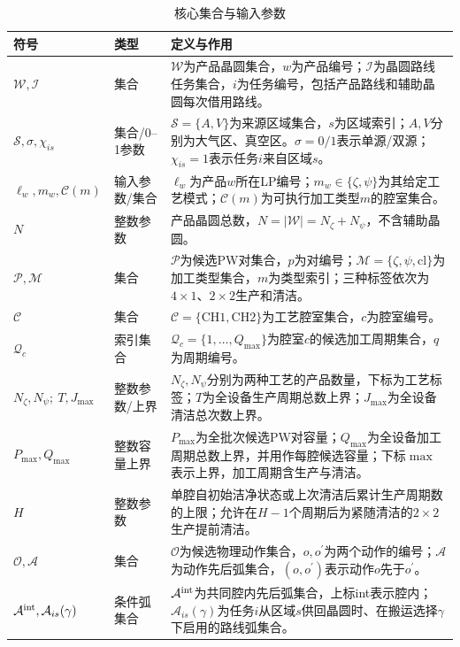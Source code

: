 \documentclass[final,5p,times,twocolumn]{elsarticle}
\begin{document}
\begin{table}[!t]
\centering
\scriptsize
\setlength{\tabcolsep}{3pt}
\caption{核心集合与输入参数}
\label{tab:symbol-cn-a}
\begin{tabular}{C{0.23\textwidth}C{0.10\textwidth}C{0.61\textwidth}}
\toprule
符号 & 类型 & 定义与作用 \\
\midrule
$\mathcal W,\mathcal I$ & 集合 & $\mathcal W$为产品晶圆集合，$w$为产品编号；$\mathcal I$为晶圆路线任务集合，$i$为任务编号，包括产品路线和辅助晶圆每次借用路线。\\
$\mathcal S,\sigma,\chi_{is}$ & 集合/0--1参数 & $\mathcal S=\{A,V\}$为来源区域集合，$s$为区域索引；$A,V$分别为大气区、真空区。$\sigma=0/1$表示单源/双源；$\chi_{is}=1$表示任务$i$来自区域$s$。\\
$\ell_w,m_w,\mathcal C(m)$ & 输入参数/集合 & $\ell_w$为产品$w$所在LP编号；$m_w\in\{\zeta,\psi\}$为其给定工艺模式；$\mathcal C(m)$为可执行加工类型$m$的腔室集合。\\
$N$ & 整数参数 & 产品晶圆总数，$N=|\mathcal W|=N_{\zeta}+N_{\psi}$，不含辅助晶圆。\\
$\mathcal P,\mathcal M$ & 集合 & $\mathcal P$为候选PW对集合，$p$为对编号；$\mathcal M=\{\zeta,\psi,\mathrm{cl}\}$为加工类型集合，$m$为类型索引；三种标签依次为$4\times1$、$2\times2$生产和清洁。\\
$\mathcal C$ & 集合 & $\mathcal C=\{\mathrm{CH1,CH2}\}$为工艺腔室集合，$c$为腔室编号。\\
$\mathcal Q_c$ & 索引集合 & $\mathcal Q_c=\{1,\ldots,Q_{\max}\}$为腔室$c$的候选加工周期集合，$q$为周期编号。\\
$N_{\zeta},N_{\psi};\ T,J_{\max}$ & 整数参数/上界 & $N_{\zeta},N_{\psi}$分别为两种工艺的产品数量，下标为工艺标签；$T$为全设备生产周期总数上界；$J_{\max}$为全设备清洁总次数上界。\\
$P_{\max},Q_{\max}$ & 整数容量上界 & $P_{\max}$为全批次候选PW对容量；$Q_{\max}$为全设备加工周期总数上界，并用作每腔候选容量；下标$\max$表示上界，加工周期含生产与清洁。\\
$H$ & 整数参数 & 单腔自初始洁净状态或上次清洁后累计生产周期数的上限；允许在$H-1$个周期后为紧随清洁的$2\times2$生产提前清洁。\\
$\mathcal O,\mathcal A$ & 集合 & $\mathcal O$为候选物理动作集合，$o,o^{\prime}$为两个动作的编号；$\mathcal A$为动作先后弧集合，$(o,o^{\prime})$表示动作$o$先于$o^{\prime}$。\\
$\mathcal A^{\rm int},\mathcal A_{is}(\gamma)$ & 条件弧集合 & $\mathcal A^{\rm int}$为共同腔内先后弧集合，上标int表示腔内；$\mathcal A_{is}(\gamma)$为任务$i$从区域$s$供回晶圆时、在搬运选择$\gamma$下启用的路线弧集合。\\

\end{tabular}
\end{table}
\end{document}
